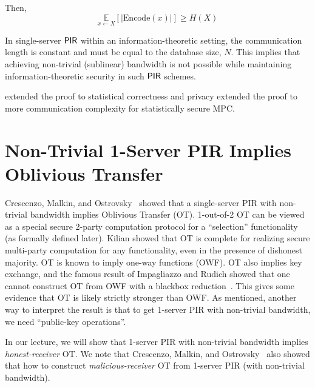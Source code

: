 {Then,
\begin{equation*}
\underset{x \leftarrow X}{\mathbb{E}}\left[ \lvert \text{Encode}(x) \rvert \right] \geq H(X)
\end{equation*}

In single-server ${\sf PIR}$ within an information-theoretic setting, the communication length is constant and must be equal to the database size, $N$. This implies that achieving non-trivial (sublinear) bandwidth is not possible while maintaining information-theoretic security in such ${\sf PIR}$ schemes.

\begin{remark}
\cite{DLN19} extended the proof to statistical correctness and privacy extended the proof to more communication complexity for statistically secure MPC. 
\end{remark}
}

\section{Non-Trivial 1-Server PIR Implies Oblivious Transfer}

Crescenzo, Malkin, and Ostrovsky~\cite{CMO00} showed that a single-server PIR with non-trivial bandwidth implies Oblivious Transfer (OT). 
1-out-of-2 OT can be viewed as a special secure 2-party computation 
protocol for a ``selection'' functionality (as formally defined later).
Kilian showed that OT is complete for realizing secure 
multi-party computation for any functionality, even in the presence
of dishonest majority.
OT is known to imply one-way functions (OWF). 
OT also implies key exchange, and the famous
result of Impagliazzo and Rudich showed
that one cannot construct 
OT from OWF with a blackbox reduction~\cite{IR89}.
This gives some evidence that OT is likely strictly stronger than OWF.
As mentioned, another way to interpret the result
is that to get 1-server PIR with non-trivial bandwidth, we need 
``public-key operations''.


In our lecture, we will show that 
1-server PIR with non-trivial bandwidth implies {\it honest-receiver} OT. 
We note that Crescenzo, Malkin, and Ostrovsky~\cite{CMO00}
also showed that how to construct {\it malicious-receiver} OT from 1-server PIR 
(with non-trivial bandwidth).

